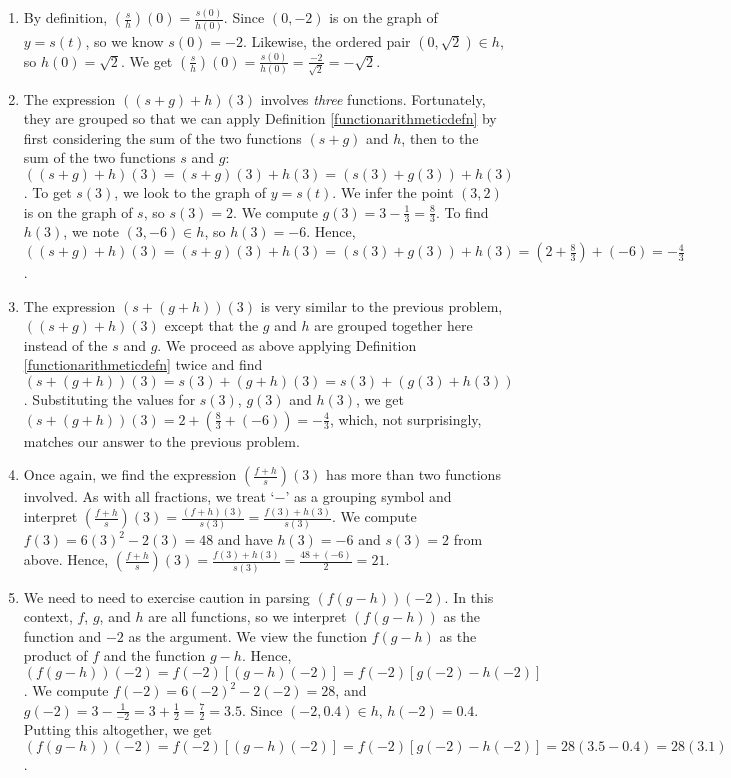 \documentclass{ximera}
\begin{document}
\begin{example}
\begin{enumerate}
\begin{enumerate}
\item By definition, $\left( \frac{s}{h} \right)(0) = \frac{s(0)}{h(0)}$.  Since $(0, -2)$ is on the graph of $y=s(t)$, so we know $s(0)  = -2$.  Likewise, the ordered pair $(0, \sqrt{2}) \in h$, so $h(0) = \sqrt{2}$.  We get  $\left( \frac{s}{h} \right)(0) = \frac{s(0)}{h(0)} = \frac{-2}{\sqrt{2}} = -\sqrt{2}$.

\item  The expression $((s+g)+h)(3)$ involves \textit{three} functions.  Fortunately, they are grouped so that we can apply Definition \ref{functionarithmeticdefn} by first considering the sum of the two functions $(s+g)$ and $h$, then to the sum of the two functions $s$ and $g$: $((s+g)+h)(3) = (s+g)(3)+h(3) = (s(3)+g(3))+h(3)$.  To get $s(3)$, we look to the graph of $y = s(t)$.  We infer the point $(3,2)$ is on the graph of $s$, so $s(3) = 2$.  We compute $g(3) = 3-\frac{1}{3} = \frac{8}{3}$.  To find $h(3)$, we note $(3, -6) \in h$, so $h(3) = -6$.  Hence, $((s+g)+h)(3) = (s+g)(3)+h(3) = (s(3)+g(3))+h(3) = \left(2+\frac{8}{3}\right) + (-6) = -\frac{4}{3}$.

\item The expression   $(s+(g+h))(3)$ is very similar to the previous problem, $((s+g)+h)(3)$ except that the $g$ and $h$ are grouped together here instead of the $s$ and $g$.  We proceed as above applying Definition \ref{functionarithmeticdefn} twice and find $(s+(g+h))(3) = s(3) + (g+h)(3) = s(3)+(g(3)+h(3))$.  Substituting the values for $s(3)$, $g(3)$ and $h(3)$, we get   $(s+(g+h))(3) = 2 + \left(\frac{8}{3} + (-6)\right)  = -\frac{4}{3}$, which, not surprisingly, matches our answer to the previous problem.

\item  Once again, we find the expression  $\left(\frac{f+h}{s}\right)(3)$ has more than two functions involved.  As with all fractions, we treat `$-$' as a grouping symbol and interpret  $\left(\frac{f+h}{s}\right)(3) = \frac{(f+h)(3)}{s(3)} = \frac{f(3)+h(3)}{s(3)}$.  We compute $f(3) = 6(3)^2-2(3) = 48$ and have $h(3) = -6$ and $s(3) = 2$ from above.  Hence, $\left(\frac{f+h}{s}\right)(3) =  \frac{f(3)+h(3)}{s(3)} = \frac{48+(-6)}{2} = 21$.

\item We need to need to exercise caution in parsing $(f(g-h))(-2)$.  In this context, $f$, $g$, and $h$ are all functions, so we interpret $(f(g-h))$ as the function and $-2$ as the argument. We view the function $f(g-h)$ as the product of $f$ and the function $g-h$.  Hence, $(f(g-h))(-2) = f(-2) [(g-h)(-2)] = f(-2) [g(-2) - h(-2)]$.  We compute $f(-2) = 6(-2)^2-2(-2) = 28$, and $g(-2)= 3 - \frac{1}{-2} = 3 + \frac{1}{2} = \frac{7}{2} = 3.5$.  Since $(-2, 0.4) \in h$, $h(-2) = 0.4$.  Putting this altogether, we get $(f(g-h))(-2) = f(-2) [(g-h)(-2)] = f(-2) [g(-2) - h(-2)] = 28(3.5-0.4) = 28(3.1) = 86.8$.


\end{enumerate}
\end{enumerate}
\end{example}
\end{document}
